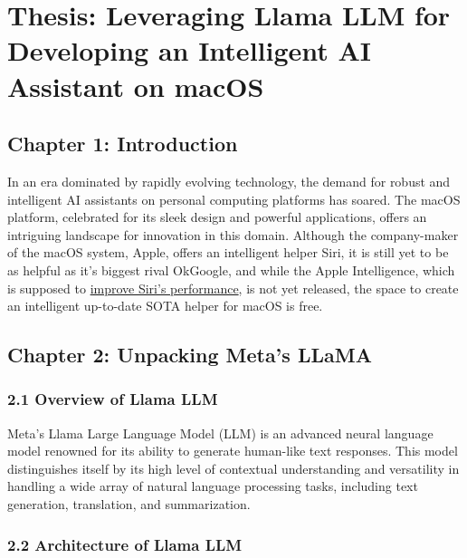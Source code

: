 \hypertarget{thesis-leveraging-llama-llm-for-developing-an-intelligent-ai-assistant-on-macos}{%
\section{Thesis: Leveraging Llama LLM for Developing an Intelligent AI
Assistant on
macOS}\label{thesis-leveraging-llama-llm-for-developing-an-intelligent-ai-assistant-on-macos}}

\hypertarget{chapter-1-introduction}{%
\subsection{Chapter 1: Introduction}\label{chapter-1-introduction}}

In an era dominated by rapidly evolving technology, the demand for
robust and intelligent AI assistants on personal computing platforms has
soared. The macOS platform, celebrated for its sleek design and powerful
applications, offers an intriguing landscape for innovation in this
domain. Although the company-maker of the macOS system, Apple, offers an
intelligent helper Siri, it is still yet to be as helpful as it's
biggest rival OkGoogle, and while the Apple Intelligence, which is
supposed to
\href{https://www.apple.com/newsroom/2024/06/introducing-apple-intelligence-for-iphone-ipad-and-mac/}{improve
Siri's performance}, is not yet released, the space to create an
intelligent up-to-date SOTA helper for macOS is free.

\hypertarget{chapter-2-unpacking-metas-llama}{%
\subsection{Chapter 2: Unpacking Meta's
LLaMA}\label{chapter-2-unpacking-metas-llama}}

\hypertarget{overview-of-llama-llm}{%
\subsubsection{2.1 Overview of Llama LLM}\label{overview-of-llama-llm}}

Meta's Llama Large Language Model (LLM) is an advanced neural language
model renowned for its ability to generate human-like text responses.
This model distinguishes itself by its high level of contextual
understanding and versatility in handling a wide array of natural
language processing tasks, including text generation, translation, and
summarization.

\hypertarget{architecture-of-llama-llm}{%
\subsubsection{2.2 Architecture of Llama
LLM}\label{architecture-of-llama-llm}}

